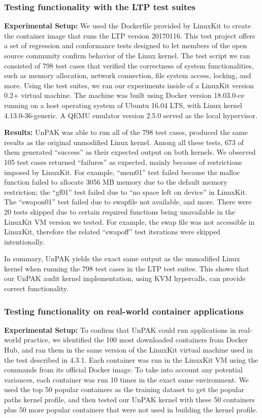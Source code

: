 \subsubsection{Testing functionality with the LTP test suites}
\label{sec.evaluation.3.1} 
\textbf{Experimental Setup:} We used the Dockerfile provided by LinuxKit \cite{LinuxKit} to create the container image that runs the LTP version 20170116. 
This test project offers a set of regression and conformance tests designed to let members of the open source community confirm behavior of the Linux kernel. 
The test script we ran consisted of 798 test cases that verified the correctness of system functionalities, such as memory allocation, network connection, file system access, locking, and more. 
Using the test suites, we ran our experiments inside of a LinuxKit version 0.2+ virtual machine. The machine was built using Docker version 18.03.0-ce running on 
a host operating system of Ubuntu 16.04 LTS, with Linux kernel 4.13.0-36-generic. A QEMU emulator version 2.5.0 served as the local hypervisor. 

\textbf{Results:}  UnPAK was able to run all of the 798 test cases, produced the same results as the original unmodified Linux kernel. 
Among all these tests, 673 of them generated ``success'' as their expected output on both kernels. We observed 105 test cases returned ``failures'' as expected, 
mainly because of restrictions imposed by LinuxKit. For example, ``mem01'' test failed because the malloc function failed to allocate 3056 MB memory due to the default memory restriction; 
the ``gf01'' test failed due to ``no space left on device'' in LinuxKit. The ``swapon01'' test failed due to swapfile not available, and more. 
There were 20 tests skipped due to certain required functions being unavailable in the LinuxKit VM version we tested. 
For example, the swap file was not accessible in LinuxKit, therefore the related ``swapoff'' test iterations were skipped intentionally.

In summary, UnPAK yields the exact same output as the unmodified Linux kernel when running the 798 test cases in the LTP test suites. 
This shows that our UnPAK audit kernel implementation, using KVM hypercalls, can provide correct functionality.

\subsubsection{Testing functionality on real-world container applications}
\label{sec.evaluation.3.2} 
\textbf{Experimental Setup:} To confirm that UnPAK could run applications in real-world practice, we identified the 100 most downloaded containers from Docker Hub, 
and ran them in the same version of the LinuxKit virtual machine used in the test described in 4.3.1. Each container was run in the LinuxKit VM using the commands from its official Docker image. 
To take into account any potential variances, each container was run 10 times in the exact same environment. We used the top 50 popular containers as the training dataset to 
get the popular paths kernel profile, and then tested our UnPAK kernel with these 50 containers plus 50 more popular containers that were not used in building the kernel profile. 

